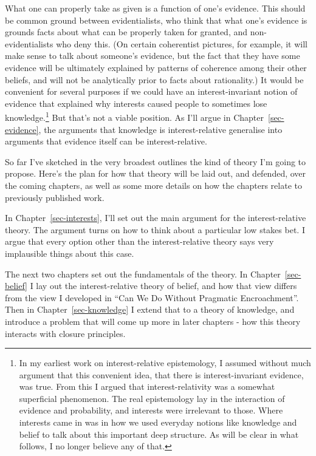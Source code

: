 \documentclass[
  12pt,
  letterpaper,
]{scrbook}
\begin{document}
What one can properly take as given is a function of one's evidence.
This should be common ground between evidentialists, who think that what
one's evidence is grounds facts about what can be properly taken for
granted, and non-evidentialists who deny this. (On certain coherentist
pictures, for example, it will make sense to talk about someone's
evidence, but the fact that they have some evidence will be ultimately
explained by patterns of coherence among their other beliefs, and will
not be analytically prior to facts about rationality.) It would be
convenient for several purposes if we could have an interest-invariant
notion of evidence that explained why interests caused people to
sometimes lose knowledge.\footnote{In my earliest work on
  interest-relative epistemology, I assumed without much argument that
  this convenient idea, that there is interest-invariant evidence, was
  true. From this I argued that interest-relativity was a somewhat
  superficial phenomenon. The real epistemology lay in the interaction
  of evidence and probability, and interests were irrelevant to those.
  Where interests came in was in how we used everyday notions like
  knowledge and belief to talk about this important deep structure. As
  will be clear in what follows, I no longer believe any of that.} But
that's not a viable position. As I'll argue in
Chapter~\ref{sec-evidence}, the arguments that knowledge is
interest-relative generalise into arguments that evidence itself can be
interest-relative.

So far I've sketched in the very broadest outlines the kind of theory
I'm going to propose. Here's the plan for how that theory will be laid
out, and defended, over the coming chapters, as well as some more
details on how the chapters relate to previously published work.

In Chapter~\ref{sec-interests}, I'll set out the main argument for the
interest-relative theory. The argument turns on how to think about a
particular low stakes bet. I argue that every option other than the
interest-relative theory says very implausible things about this case.

The next two chapters set out the fundamentals of the theory. In
Chapter~\ref{sec-belief} I lay out the interest-relative theory of
belief, and how that view differs from the view I developed in ``Can We
Do Without Pragmatic Encroachment''. Then in Chapter~\ref{sec-knowledge}
I extend that to a theory of knowledge, and introduce a problem that
will come up more in later chapters - how this theory interacts with
closure principles.
\end{document}
